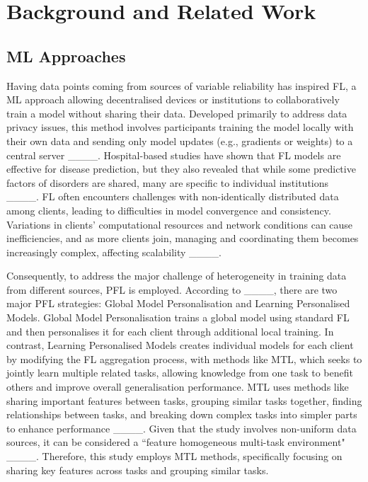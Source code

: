 \section{Background and Related Work}
\subsection{ML Approaches}

Having data points coming from sources of variable reliability has inspired \gls{FL}, a \gls{ML} approach allowing decentralised devices or institutions to collaboratively train a model without sharing their data. Developed primarily to address data privacy issues, this method involves participants training the model locally with their own data and sending only model updates (e.g., gradients or weights) to a central server ____. 
Hospital-based studies have shown that \gls{FL} models are effective for disease prediction, but they also revealed that while some predictive factors of disorders are shared, many are specific to individual institutions ____. \gls{FL} often encounters challenges with non-identically distributed data among clients, leading to difficulties in model convergence and consistency. Variations in clients' computational resources and network conditions can cause inefficiencies, and as more clients join, managing and coordinating them becomes increasingly complex, affecting scalability ____.

Consequently, to address the major challenge of heterogeneity in training data from different sources, \gls{PFL} is employed. According to ____, there are two major \gls{PFL} strategies: Global Model Personalisation and Learning Personalised Models. Global Model Personalisation trains a global model using standard \gls{FL} and then personalises it for each client through additional local training. In contrast, Learning Personalised Models creates individual models for each client by modifying the \gls{FL} aggregation process, with methods like \gls{MTL}, which seeks to jointly learn multiple related tasks, allowing knowledge from one task to benefit others and improve overall generalisation performance. \gls{MTL} uses methods like sharing important features between tasks, grouping similar tasks together, finding relationships between tasks, and breaking down complex tasks into simpler parts to enhance performance ____. Given that the study involves non-uniform data sources, it can be considered a ``feature homogeneous multi-task environment" ____. Therefore, this study employs \gls{MTL} methods, specifically focusing on sharing key features across tasks and grouping similar tasks.


